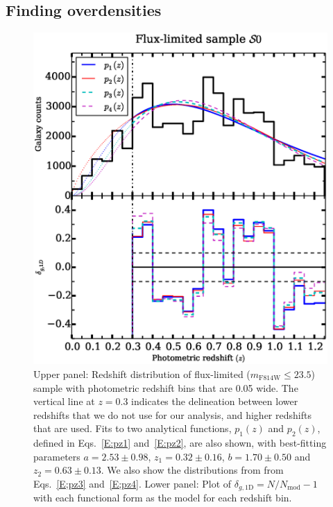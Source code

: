 \documentclass[twocolumn,useAMS,usenatbib]{mn2e}
\begin{document}
\subsection{Finding overdensities}
\label{sub:overdensities}
\begin{figure}
 \centering
  \includegraphics[width=\columnwidth]{redshift_fluxlimited_type1}
  \caption{Upper panel: Redshift distribution of flux-limited
    ($m_\text{F814W}\le 23.5$) sample with photometric redshift bins
    that are 0.05 wide. The vertical line at $z=0.3$ indicates the delineation between lower redshifts that we do not use for our analysis, and higher redshifts that are used. Fits to two analytical functions, $p_1(z)$ and $p_2(z)$, defined in Eqs.~\ref{E:pz1} and~\ref{E:pz2}, are also shown, with best-fitting parameters $a=2.53\pm0.98$, $z_1=0.32\pm0.16$, $b=1.70\pm0.50$ and $z_2=0.63\pm0.13$.  We also show the distributions from \protect\cite{2004ApJ...617..765C} from Eqs.~\ref{E;pz3} and~\ref{E;pz4}. 
           Lower panel: Plot of $\delta_{g,\text{1D}} =
           N/N_{\text{mod}}-1$ with each functional form as the model
           for each redshift bin.
}
  \label{fig:redshift_fluxlimited}
\end{figure}
\end{document}
